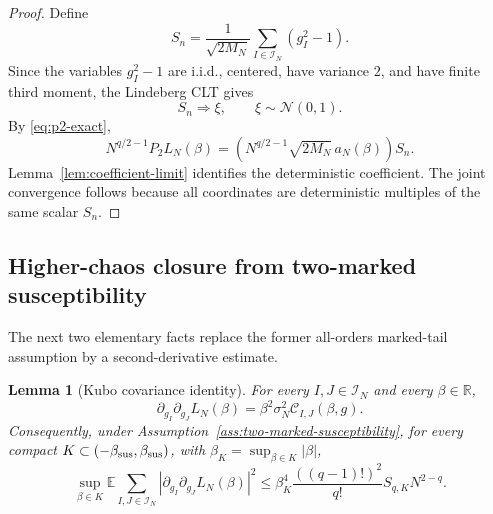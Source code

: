 \documentclass[11pt]{article}
\newtheorem{lemma}[theorem]{Lemma}
\newcommand{\E}{\mathbb{E}}
\newcommand{\N}{\mathcal{N}}
\newcommand{\R}{\mathbb{R}}
\newcommand{\calI}{\mathcal{I}}
\begin{document}
\begin{proof}
  Define
  \begin{equation}\label{eq:Sn}
    S_n=
    \frac1{\sqrt{2M_N}}
    \sum_{I\in\calI_N}(g_I^2-1).
  \end{equation}
  Since the variables $g_I^2-1$ are i.i.d., centered, have variance $2$, and
  have finite third moment, the Lindeberg CLT gives
  \begin{equation}\label{eq:Sn-clt}
    S_n\Rightarrow\xi,
    \qquad
    \xi\sim\N(0,1).
  \end{equation}
  By \eqref{eq:p2-exact},
  \begin{equation}\label{eq:p2-Sn}
    N^{q/2-1}P_2L_N(\beta)
    =
    \left(N^{q/2-1}\sqrt{2M_N}\,a_N(\beta)\right)S_n.
  \end{equation}
  Lemma~\ref{lem:coefficient-limit} identifies the deterministic coefficient.
  The joint convergence follows because all coordinates are deterministic
  multiples of the same scalar $S_n$.
\end{proof}

\subsection{Higher-chaos closure from two-marked susceptibility}

The next two elementary facts replace the former all-orders marked-tail
assumption by a second-derivative estimate.

\begin{lemma}[Kubo covariance identity]
  \label{lem:kubo-hessian}
  For every $I,J\in\calI_N$ and every $\beta\in\R$,
  \begin{equation}\label{eq:hessian-kubo}
    \partial_{g_I}\partial_{g_J}L_N(\beta)
    =
    \beta^2\sigma_N^2\mathcal C_{I,J}(\beta,g).
  \end{equation}
  Consequently, under Assumption~\ref{ass:two-marked-susceptibility}, for
  every compact $K\subset(-\beta_{\rm sus},\beta_{\rm sus})$, with
  $\beta_K=\sup_{\beta\in K}|\beta|$,
  \begin{equation}\label{eq:hessian-hs-bound}
    \sup_{\beta\in K}
    \E
    \sum_{I,J\in\calI_N}
    \left|
      \partial_{g_I}\partial_{g_J}L_N(\beta)
    \right|^2
    \leq
    \beta_K^4\frac{((q-1)!)^2}{q!}S_{q,K}N^{2-q}.
  \end{equation}
\end{lemma}
\end{document}
